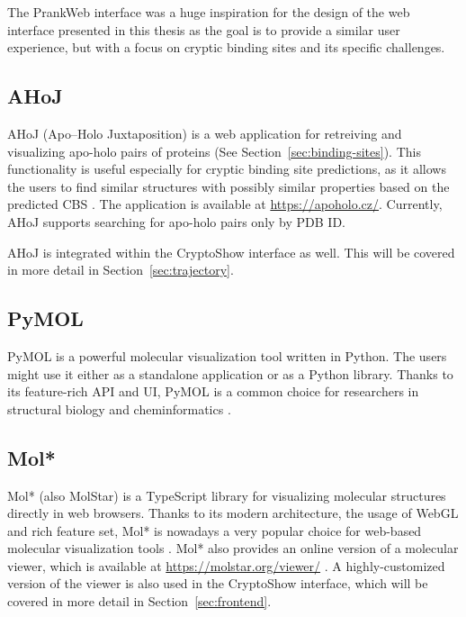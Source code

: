The PrankWeb interface was a huge inspiration for the design of the web interface presented in this thesis as the goal is to provide a similar user experience, but with a focus on cryptic binding sites and its specific challenges.

\subsection{AHoJ}
\label{sec:ahoj}

AHoJ (Apo–Holo Juxtaposition) is a web application for retreiving and visualizing apo-holo pairs of proteins (See Section~\ref{sec:binding-sites}). This functionality is useful especially for cryptic binding site predictions, as it allows the users to find similar structures with possibly similar properties based on the predicted CBS \cite{feidakis2022ahoj}. The application is available at \url{https://apoholo.cz/}. Currently, AHoJ supports searching for apo-holo pairs only by PDB ID.

AHoJ is integrated within the CryptoShow interface as well. This will be covered in more detail in Section~\ref{sec:trajectory}.

\subsection{PyMOL}
\label{sec:pymol}

PyMOL is a powerful molecular visualization tool written in Python. The users might use it either as a standalone application or as a Python library. Thanks to its feature-rich API and UI, PyMOL is a common choice for researchers in structural biology and cheminformatics \cite{delano2002pymol}.

\subsection{Mol*}
\label{sec:molstar}

Mol* (also MolStar) is a TypeScript library for visualizing molecular structures directly in web browsers. Thanks to its modern architecture, the usage of WebGL and rich feature set, Mol* is nowadays a very popular choice for web-based molecular visualization tools \cite{sehnal2018mol}. Mol* also provides an online version of a molecular viewer, which is available at \url{https://molstar.org/viewer/} \cite{sehnal2021mol}. A highly-customized version of the viewer is also used in the CryptoShow interface, which will be covered in more detail in Section~\ref{sec:frontend}.

